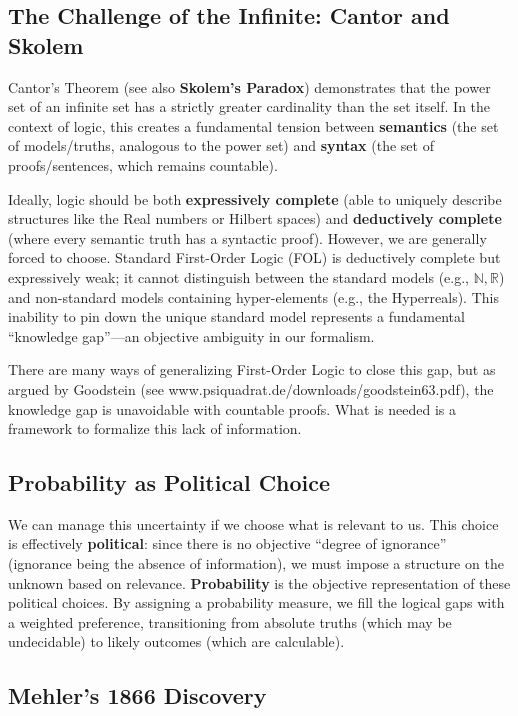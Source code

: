 \documentclass{stex}
\begin{document}
\subsection{The Challenge of the Infinite: Cantor and Skolem}

Cantor's Theorem (see also \textbf{Skolem's Paradox}) demonstrates that the power set of an infinite set has a strictly greater cardinality than the set itself. In the context of logic, this creates a fundamental tension between \textbf{semantics} (the set of models/truths, analogous to the power set) and \textbf{syntax} (the set of proofs/sentences, which remains countable).

Ideally, logic should be both \textbf{expressively complete} (able to uniquely describe structures like the Real numbers or Hilbert spaces) and \textbf{deductively complete} (where every semantic truth has a syntactic proof). However, we are generally forced to choose. Standard First-Order Logic (FOL) is deductively complete but expressively weak; it cannot distinguish between the standard models (e.g., $\mathbb{N}, \mathbb{R}$) and non-standard models containing hyper-elements (e.g., the Hyperreals). This inability to pin down the unique standard model represents a fundamental ``knowledge gap''---an objective ambiguity in our formalism.

There are many ways of generalizing First-Order Logic to close this gap, but as argued by Goodstein (see www.psiquadrat.de/downloads/goodstein63.pdf), the knowledge gap is unavoidable with countable proofs. What is needed is a framework to formalize this lack of information.

\subsection{Probability as Political Choice}

We can manage this uncertainty if we choose what is relevant to us. This choice is effectively \textbf{political}: since there is no objective ``degree of ignorance'' (ignorance being the absence of information), we must impose a structure on the unknown based on relevance. \textbf{Probability} is the objective representation of these political choices. By assigning a probability measure, we fill the logical gaps with a weighted preference, transitioning from absolute truths (which may be undecidable) to likely outcomes (which are calculable).

\subsection{Mehler's 1866 Discovery}
\end{document}
